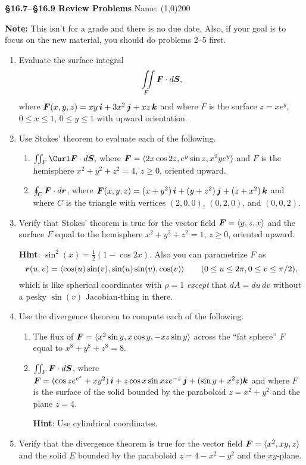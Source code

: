 \documentclass[12pt]{article}
\newcommand{\hint}[1]{\textbf{Hint}: #1}
\newcommand{\resultbox}[1]{\begin{center}
		\begin{tcolorbox}[
			enhanced,
			colback=white,
			colframe=white,
			boxrule=0.5pt,
			arc=0pt,
			top=3mm,
			bottom=3mm, 
			width=7in%
			]
			#1
		\end{tcolorbox}
\end{center}}
\begin{document}
	\begin{flushright}{\large \textbf{\S16.7--\S16.9 Review Problems}} \hfill Name: \line(1,0){200}\end{flushright}
	\resultbox{\textbf{Note:} This isn't for a grade and there is no due date. Also, if your goal is to focus on the new material, you should do problems 2--5 first.}
	\begin{enumerate}
		\item Evaluate the surface integral 
		$$\iint\limits_F \boldsymbol{F}\cdot d\boldsymbol{S},$$ where $\boldsymbol{F}(x,y,z)=xy\,\boldsymbol{i}+3x^2\,\boldsymbol{j}+xz\,\boldsymbol{k}$ and where $F$ is the surface $z=xe^y$, $0\leq x\leq 1$, $0\leq y\leq 1$ with upward orientation.
		\item Use Stokes' theorem to evaluate each of the following.
			\begin{enumerate}
				\item $\iint_F\Curl\vect{F}\cdot d\vect{S},$
				where $\boldsymbol{F}=\langle2x\cos{2z},e^y\sin{z},x^2ye^y\rangle$ and $F$ is the hemisphere $x^2+y^2+z^2=4$, $z\geq 0$, oriented upward.
				\item $\oint_C\boldsymbol{F}\cdot d\boldsymbol{r}$, where $\boldsymbol{F}(x,y,z)=(x+y^2)\,\boldsymbol{i}+(y+z^2)\,\boldsymbol{j}+(z+x^2)\,\boldsymbol{k}$ and where $C$ is the triangle with vertices $(2,0,0)$, $(0,2,0)$, and $(0,0,2)$.
			\end{enumerate}
		\item Verify that Stokes' theorem is true for the vector field $\boldsymbol{F}=\langle y, z, x\rangle$ and the surface $F$ equal to the hemisphere $x^2+y^2+z^2=1$, $z\geq 0$, oriented upward. 
		
		\hint{$\sin^2(x)=\frac{1}{2}(1-\cos{2x})$. Also you can parametrize $F$ as 
		$$\boldsymbol{r}(u,v)=\langle \cos(u)\sin(v),\sin(u)\sin(v),\cos(v)\rangle\quad\quad(0\leq u\leq 2\pi, 0\leq v\leq \pi/2),$$
		which is like spherical coordinates with $\rho=1$ \textit{except} that $dA=du\,dv$ without a pesky $\sin(v)$ Jacobian-thing in there.}
		\item Use the divergence theorem to compute each of the following.
			\begin{enumerate}
				\item The flux of $\boldsymbol{F}=\langle x^2\sin{y},x\cos{y},-xz\sin{y}\rangle$ across the ``fat sphere'' $F$ equal to $x^8+y^8+z^8=8$.
				\item $\iint_F\boldsymbol{F}\cdot d\boldsymbol{S}$, where $\boldsymbol{F}=(\cos{z}e^{e^z}+xy^2)\,\boldsymbol{i}+z\cos{x}\sin{xz}e^{-z}\,\boldsymbol{j}+(\sin{y}+x^2z)\boldsymbol{k}$ and where $F$ is the surface of the solid bounded by the paraboloid $z=x^2+y^2$ and the plane $z=4$. 
				
				\hint{Use cylindrical coordinates}.
			\end{enumerate}
		\item Verify that the divergence theorem is true for the vector field $\boldsymbol{F}=\langle x^2,xy,z\rangle$ and the solid $E$ bounded by the paraboloid $z=4-x^2-y^2$ and the $xy$-plane.
	\end{enumerate}
\end{document}
